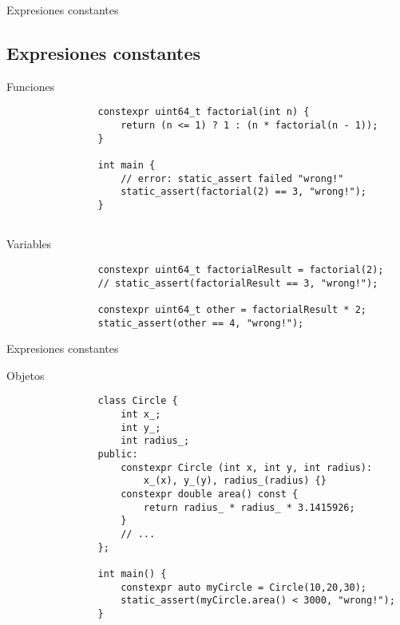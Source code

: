 \documentclass{beamer}
\newcommand{\normalSizeItem}[1] {
  \normalsize{\item #1}
}
\newcommand{\smallCite}[1]{
	\begin{small}
		\cite{#1}	
	\end{small}
}
\begin{document}
		\begin{frame}[fragile]{Expresiones constantes \ttfamily{(constexpr)\smallCite{constexpr}}}	
			\subsection{Expresiones constantes }		
			\begin{itemize}
			
				\normalSizeItem { Funciones }
				\begin{lstlisting}
				constexpr uint64_t factorial(int n) {
					return (n <= 1) ? 1 : (n * factorial(n - 1));
				}
				
				int main {
					// error: static_assert failed "wrong!"
					static_assert(factorial(2) == 3, "wrong!");
				}
				
				\end{lstlisting}
				
				\normalSizeItem { Variables }
				\begin{lstlisting}
				constexpr uint64_t factorialResult = factorial(2);
				// static_assert(factorialResult == 3, "wrong!");
			
				constexpr uint64_t other = factorialResult * 2;
				static_assert(other == 4, "wrong!");
				\end{lstlisting}
				
			\end{itemize}
		\end{frame}
		
		\begin{frame}[fragile]{Expresiones constantes }		
			\begin{itemize}
			
				\normalSizeItem { Objetos }
				\begin{lstlisting}
				class Circle {
					int x_;
					int y_;
					int radius_;
				public:
					constexpr Circle (int x, int y, int radius): 
						x_(x), y_(y), radius_(radius) {}
					constexpr double area() const {
						return radius_ * radius_ * 3.1415926;
					}
					// ...
				};
				
				int main() {
					constexpr auto myCircle = Circle(10,20,30);
					static_assert(myCircle.area() < 3000, "wrong!");
				}
				
				\end{lstlisting}
			\end{itemize}
		\end{frame}
		
\end{document}
